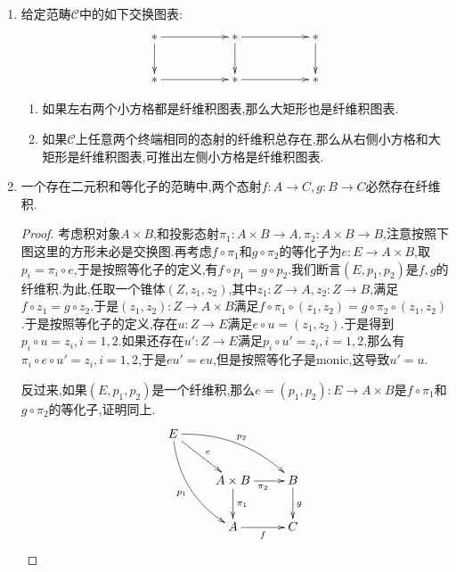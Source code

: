 \begin{enumerate}
\begin{proof}
		如果$g:B\to C$是一个同构,取$f,g$上的锥$(A,1_A,g^{-1}\circ f)$,按照纤维积定义存在唯一的态射$u:A\to P$满足$g'\circ u=1_A$和$f'\circ u=g^{-1}\circ f$.现在$g'\circ u\circ g'=g'=g'\circ 1_P$和$f'\circ u\circ g'=g^{-1}\circ f\circ g'=g^{-1}\circ g\circ f'=f'\circ 1_P$.于是按照纤维积的泛性质,得到$u\circ g'=1_P$,于是$u$是$g'$的逆态射,于是$g'$是同构.
	\end{proof}
	\item 给定范畴$\mathscr{C}$中的如下交换图表:
	$$\xymatrix{\ast\ar[rr]\ar[d]&&\ast\ar[rr]\ar[d]&&\ast\ar[d]\\\ast\ar[rr]&&\ast\ar[rr]&&\ast}$$
	\begin{enumerate}
		\item 如果左右两个小方格都是纤维积图表,那么大矩形也是纤维积图表.
		\item 如果$\mathscr{C}$上任意两个终端相同的态射的纤维积总存在,那么从右侧小方格和大矩形是纤维积图表,可推出左侧小方格是纤维积图表.
	\end{enumerate}
    \item 一个存在二元积和等化子的范畴中,两个态射$f:A\to C,g:B\to C$必然存在纤维积.
    \begin{proof}
    	
    	考虑积对象$A\times B$,和投影态射$\pi_1:A\times B\to A,\pi_2:A\times B\to B$,注意按照下图这里的方形未必是交换图.再考虑$f\circ\pi_1$和$g\circ\pi_2$的等化子为$e:E\to A\times B$,取$p_i=\pi_i\circ e$,于是按照等化子的定义,有$f\circ p_1=g\circ p_2$.我们断言$(E,p_1,p_2)$是$f,g$的纤维积.为此,任取一个锥体$(Z,z_1,z_2)$,其中$z_1:Z\to A,z_2:Z\to B$,满足$f\circ z_1=g\circ z_2$.于是$(z_1,z_2):Z\to A\times B$满足$f\circ\pi_1\circ(z_1,z_2)=g\circ\pi_2\circ(z_1,z_2)$.于是按照等化子的定义,存在$u:Z\to E$满足$e\circ u=(z_1,z_2)$.于是得到$p_i\circ u=z_i,i=1,2$.如果还存在$u':Z\to E$满足$p_i\circ u'=z_i,i=1,2$,那么有$\pi_i\circ e\circ u'=z_i,i=1,2$,于是$eu'=eu$,但是按照等化子是monic,这导致$u'=u$.
    	
    	反过来,如果$(E,p_1,p_2)$是一个纤维积,那么$e=(p_1,p_2):E\to A\times B$是$f\circ\pi_1$和$g\circ\pi_2$的等化子,证明同上.
    	$$\xymatrix{E\ar@/^1pc/[drr]^{p_2}\ar[dr]^e\ar@/_1pc/[ddr]_{p_1}&&\\&A\times B\ar[r]_{\pi_2}\ar[d]^{\pi_1}&B\ar[d]^g\\&A\ar[r]_f&C}$$
    \end{proof}
\end{enumerate}

